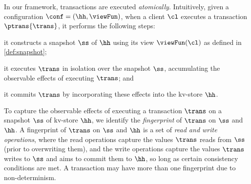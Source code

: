 In our framework, transactions are executed \emph{atomically}. 
Intuitively, given a configuration $\conf = (\hh, \viewFun)$, 
when a client $\cl$ executes a transaction $\ptrans{\trans}$, 
it performs the following steps: 
\begin{enumerate*}
	\item it constructs a snapshot $\ss$ of $\hh$ using its view $\viewFun(\cl)$ as defined in \cref{def:snapshot};  
	\item it executes $\trans$ in isolation over the snapshot $\ss$, accumulating the observable 
effects of executing $\trans$; and
	\item it commits $\trans$ by incorporating these effects into 
the kv-store $\hh$.
\end{enumerate*}


To capture the observable effects of executing a transaction $\trans$ on a snapshot $\ss$ of kv-store $\hh$, 
we identify the \emph{fingerprint} of $\trans$ on $\ss$ and $\hh$.
A fingerprint of $\trans$ on $\ss$ and $\hh$
is a set of \emph{read and write operations}, where
the read operations capture the values $\trans$ reads from $\ss$ (prior to overwriting them), and
the write operations capture the values $\trans$ writes to $\ss$ and aims to commit them to $\hh$, so long as certain consistency conditions are met.  
A transaction may have more than one fingerprint due to non-determinism. 








